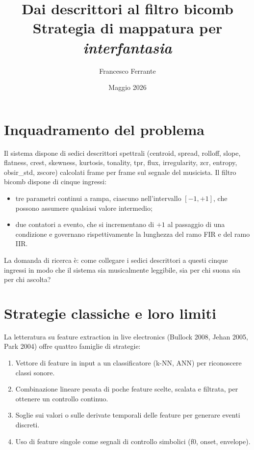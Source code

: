 \documentclass[a4paper,11pt]{article}
\title{Dai descrittori al filtro bicomb\\[0.5em]
\large Strategia di mappatura per \emph{interfantasia}}
\author{Francesco Ferrante}
\date{Maggio 2026}
\begin{document}
\maketitle

\tableofcontents
\newpage

\section{Inquadramento del problema}

Il sistema dispone di sedici descrittori spettrali (centroid, spread,
rolloff, slope, flatness, crest, skewness, kurtosis, tonality, tpr, flux,
irregularity, zcr, entropy, obsir\_std, zscore) calcolati frame per frame
sul segnale del musicista. Il filtro bicomb dispone di cinque ingressi:

\begin{itemize}[nosep]
  \item tre parametri continui a rampa, ciascuno nell'intervallo
        $[-1, +1]$, che possono assumere qualsiasi valore intermedio;
  \item due contatori a evento, che si incrementano di $+1$ al passaggio
        di una condizione e governano rispettivamente la lunghezza del
        ramo FIR e del ramo IIR.
\end{itemize}

La domanda di ricerca è: come collegare i sedici descrittori a questi
cinque ingressi in modo che il sistema sia musicalmente leggibile, sia
per chi suona sia per chi ascolta?

\section{Strategie classiche e loro limiti}

La letteratura su feature extraction in live electronics (Bullock 2008,
Jehan 2005, Park 2004) offre quattro famiglie di strategie:

\begin{enumerate}
  \item Vettore di feature in input a un classificatore (k-NN, ANN)
        per riconoscere classi sonore.
  \item Combinazione lineare pesata di poche feature scelte, scalata e
        filtrata, per ottenere un controllo continuo.
  \item Soglie sui valori o sulle derivate temporali delle feature per
        generare eventi discreti.
  \item Uso di feature singole come segnali di controllo simbolici (f0,
        onset, envelope).
\end{enumerate}
\end{document}
